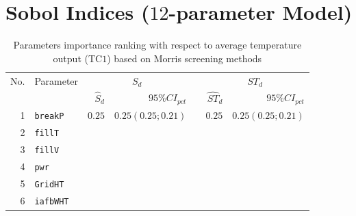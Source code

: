 \section{Sobol Indices ($12$-parameter Model)}\label{app:tbl_results_sobol}

\begin{table*}[htp]\centering
{}
\caption{Parameters importance ranking with respect to average temperature output (TC$1$) based on Morris screening methods}
\begin{tabular*}{\textwidth}{@{}rlrrrrr@{}}\toprule
\multirow{2}{*}{\footnotesize{No.}}&\multirow{2}{*}{\footnotesize{Parameter}}&\multicolumn{2}{c}{\footnotesize{$S_d$}}&\phantom{a}&\multicolumn{2}{c}{\footnotesize{$ST_d$}}\\             
                                                                              \cmidrule{3-4}                                       \cmidrule{6-7}
                                   &                                         &\footnotesize{$\hat{S}_d$}&\footnotesize{$95\%CI_{pct}$}&&\footnotesize{$\hat{ST}_d$}&\footnotesize{$95\%CI_{pct}$} \\ \midrule
\footnotesize{1}   & \footnotesize{\texttt{breakP}}     &  \footnotesize{$0.25$} &\footnotesize{$0.25 (0.25;0.21)$}&& \footnotesize{$0.25$}   &   \footnotesize{$0.25 (0.25;0.21)$}   \\
\footnotesize{2}   & \footnotesize{\texttt{fillT}}     	&                        &                                 &&                         &    \\
\footnotesize{3}   & \footnotesize{\texttt{fillV}}     	&                        &                                 &&                         &    \\
\footnotesize{4}   & \footnotesize{\texttt{pwr}}       	&                        &                                 &&                         &    \\
\footnotesize{5}   & \footnotesize{\texttt{GridHT}}     &                        &                                 &&                         &    \\
\footnotesize{6}   & \footnotesize{\texttt{iafbWHT}}    &                        &                                 &&                         &    \\

\end{tabular*}
\end{table*}
